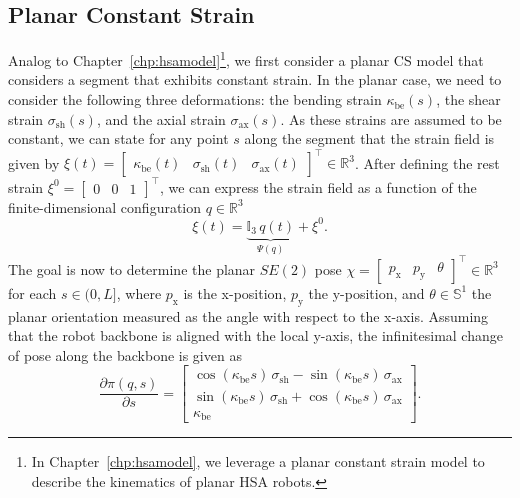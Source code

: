 \subsection{Planar Constant Strain}
Analog to Chapter~\ref{chp:hsamodel}\footnote{In Chapter~\ref{chp:hsamodel}, we leverage a planar constant strain model to describe the kinematics of planar \gls{HSA} robots.}, we first consider a planar \gls{CS} model that considers a segment that exhibits constant strain.
In the planar case, we need to consider the following three deformations: the bending strain $\kappa_\mathrm{be}(s)$, the shear strain $\sigma_\mathrm{sh}(s)$, and the axial strain $\sigma_\mathrm{ax}(s)$. As these strains are assumed to be constant, we can state for any point $s$ along the segment that the strain field is given by $\xi(t) = \begin{bmatrix}
    \kappa_\mathrm{be}(t) & \sigma_\mathrm{sh}(t) & \sigma_\mathrm{ax}(t)
\end{bmatrix}^\top \in \mathbb{R}^3$.
After defining the rest strain $\xi^0 = \begin{bmatrix}
    0 & 0 & 1
\end{bmatrix}^\top$, we can express the strain field as a function of the finite-dimensional configuration $q \in \mathbb{R}^3$
\begin{equation}
    \xi(t) = \underbrace{\mathbb{I}_3 \, q(t)}_{\Psi(q)} + \xi^0.
\end{equation}
The goal is now to determine the planar $SE(2)$ pose $\chi = \begin{bmatrix}
    p_\mathrm{x} & p_\mathrm{y} & \theta
\end{bmatrix}^\top \in \mathbb{R}^3$ for each $s \in (0,L]$, where $p_\mathrm{x}$ is the x-position, $p_\mathrm{y}$ the y-position, and $\theta \in \mathbb{S}^1$ the planar orientation measured as the angle with respect to the x-axis.
Assuming that the robot backbone is aligned with the local y-axis, the infinitesimal change of pose along the backbone is given as
\begin{equation}
    \frac{\partial \pi(q,s)}{\partial s} = \begin{bmatrix}
        \cos(\kappa_\mathrm{be} s) \, \sigma_\mathrm{sh} - \sin(\kappa_\mathrm{be} s) \, \sigma_\mathrm{ax}\\
        \sin(\kappa_\mathrm{be} s) \, \sigma_\mathrm{sh} + \cos(\kappa_\mathrm{be} s) \, \sigma_\mathrm{ax}\\
        \kappa_\mathrm{be}
    \end{bmatrix}.
\end{equation}
